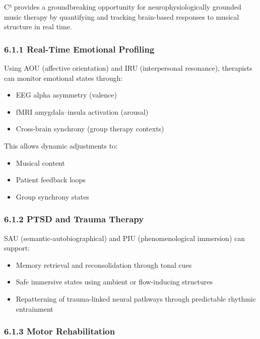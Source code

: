 \documentclass[10pt]{article}
\begin{document}
C³ provides a groundbreaking opportunity for neurophysiologically grounded music therapy by quantifying and tracking brain-based responses to musical structure in real time.

\subsubsection*{6.1.1 Real-Time Emotional Profiling}

Using AOU (affective orientation) and IRU (interpersonal resonance), therapists can monitor emotional states through:

\begin{itemize}
    \item EEG alpha asymmetry (valence)
    \item fMRI amygdala–insula activation (arousal)
    \item Cross-brain synchrony (group therapy contexts)
\end{itemize}

This allows dynamic adjustments to:

\begin{itemize}
    \item Musical content
    \item Patient feedback loops
    \item Group synchrony states
\end{itemize}

\subsubsection*{6.1.2 PTSD and Trauma Therapy}

SAU (semantic-autobiographical) and PIU (phenomenological immersion) can support:

\begin{itemize}
    \item Memory retrieval and reconsolidation through tonal cues
    \item Safe immersive states using ambient or flow-inducing structures
    \item Repatterning of trauma-linked neural pathways through predictable rhythmic entrainment
\end{itemize}

\subsubsection*{6.1.3 Motor Rehabilitation}
\end{document}
